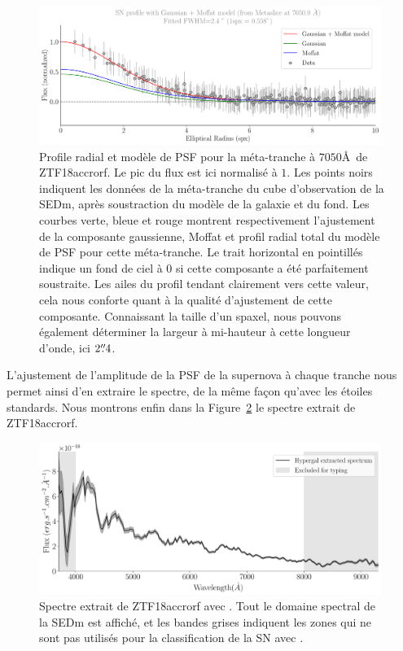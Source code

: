 \documentclass[../main/main.tex]{subfiles}
\begin{document}
\begin{figure}
  \centering
  \includegraphics[width=0.99\textwidth]{../figures/07_scene/output_sn_profile_ZTF18accrorf.pdf}
  \caption[Profile radial et modèle de PSF pour une méta-tranche de
  ZTF18accrorf.]{Profile radial et modèle de PSF pour la méta-tranche à
    $7050$\AA\ de ZTF18accrorf. Le pic du flux est ici normalisé à $1$. Les
    points noirs indiquent les données de la méta-tranche du cube
    d'observation de la SEDm, après soustraction du modèle de la galaxie
  et du fond. Les courbes verte, bleue et rouge montrent respectivement
  l'ajustement de la composante gaussienne, Moffat et profil radial
  total du modèle de PSF pour cette méta-tranche. Le trait horizontal en
pointillés indique un fond de ciel à $0$ si cette composante a été
parfaitement soustraite. Les ailes du profil tendant clairement vers
cette valeur, cela nous conforte quant à la qualité d'ajustement de
cette composante. Connaissant la taille d'un spaxel, nous pouvons
également déterminer la largeur à mi-hauteur à cette longueur d'onde, ici
$2\overset{\prime\prime}{.}4$.}
  \label{fig:radialprofileZTF18accrorf}
\end{figure}

L'ajustement de l'amplitude de la PSF de la supernova à chaque tranche
nous permet ainsi d'en extraire le spectre, de la même façon qu'avec les
étoiles standards. Nous montrons enfin dans la
Figure~\ref{fig:spectraZTF18accrorf} le spectre extrait de ZTF18accrorf.

\begin{figure}
  \centering
  \includegraphics[width=0.99\textwidth]{../figures/07_scene/output_sn_spectra_ZTF18accrorf.pdf}
  \caption[Spectre extrait de ZTF18accrorf avec \hypergal.]{Spectre
    extrait de ZTF18accrorf avec \hypergal. Tout le domaine spectral de
    la SEDm est affiché, et les bandes grises indiquent les zones
    qui ne sont pas utilisés pour la classification de la SN avec .}
  \label{fig:spectraZTF18accrorf}
\end{figure}
\end{document}
